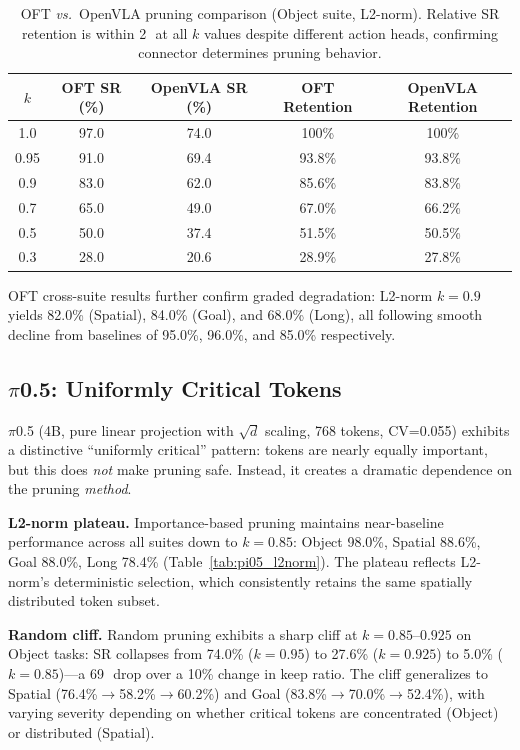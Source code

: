 \documentclass[10pt,letterpaper]{article}
\newcommand{\pp}{\,\text{pp}}
\newcommand{\vs}{\textit{vs.}}
\begin{document}
\begin{table}[t]
\centering
\caption{OFT \vs\ OpenVLA pruning comparison (Object suite, L2-norm). Relative SR retention is within 2\pp\ at all $k$ values despite different action heads, confirming connector determines pruning behavior.}
\label{tab:oft_comparison}
\small
\begin{tabular}{ccccc}
\toprule
$k$ & OFT SR (\%) & OpenVLA SR (\%) & OFT Retention & OpenVLA Retention \\
\midrule
1.0 & 97.0 & 74.0 & 100\% & 100\% \\
0.95 & 91.0 & 69.4 & 93.8\% & 93.8\% \\
0.9 & 83.0 & 62.0 & 85.6\% & 83.8\% \\
0.7 & 65.0 & 49.0 & 67.0\% & 66.2\% \\
0.5 & 50.0 & 37.4 & 51.5\% & 50.5\% \\
0.3 & 28.0 & 20.6 & 28.9\% & 27.8\% \\
\bottomrule
\end{tabular}
\end{table}

OFT cross-suite results further confirm graded degradation: L2-norm $k\!=\!0.9$ yields 82.0\% (Spatial), 84.0\% (Goal), and 68.0\% (Long), all following smooth decline from baselines of 95.0\%, 96.0\%, and 85.0\% respectively.


\subsection{$\pi$0.5: Uniformly Critical Tokens}
\label{sec:pi05}

$\pi$0.5 (4B, pure linear projection with $\sqrt{d}$ scaling, 768 tokens, CV=0.055) exhibits a distinctive ``uniformly critical'' pattern: tokens are nearly equally important, but this does \emph{not} make pruning safe. Instead, it creates a dramatic dependence on the pruning \emph{method}.

\textbf{L2-norm plateau.} Importance-based pruning maintains near-baseline performance across all suites down to $k\!=\!0.85$: Object 98.0\%, Spatial 88.6\%, Goal 88.0\%, Long 78.4\% (Table~\ref{tab:pi05_l2norm}). The plateau reflects L2-norm's deterministic selection, which consistently retains the same spatially distributed token subset.

\textbf{Random cliff.} Random pruning exhibits a sharp cliff at $k\!=\!0.85$--$0.925$ on Object tasks: SR collapses from 74.0\% ($k\!=\!0.95$) to 27.6\% ($k\!=\!0.925$) to 5.0\% ($k\!=\!0.85$)---a 69\pp\ drop over a 10\% change in keep ratio. The cliff generalizes to Spatial (76.4\%$\to$58.2\%$\to$60.2\%) and Goal (83.8\%$\to$70.0\%$\to$52.4\%), with varying severity depending on whether critical tokens are concentrated (Object) or distributed (Spatial).
\end{document}
